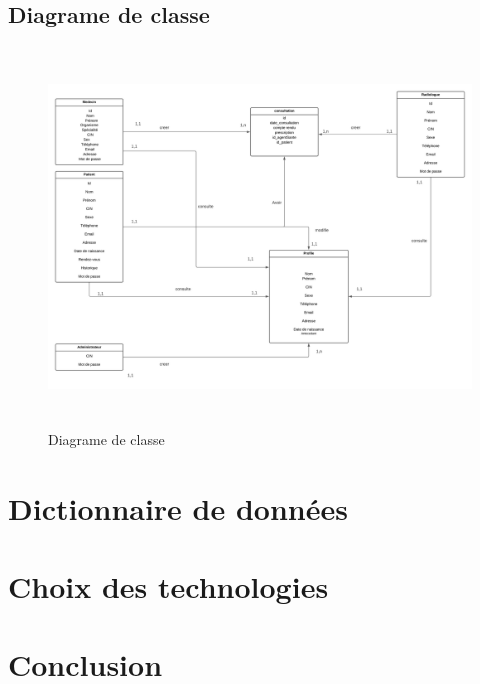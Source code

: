 \subsection{Diagrame de classe}

\begin{figure}[!h]
\begin{center}
\includegraphics[height=10cm,width=18cm]{classdiag.png}
\end{center}
\caption{Diagrame de classe}
\end{figure}

\section{Dictionnaire de données}

\section{Choix des technologies}

\section{Conclusion}